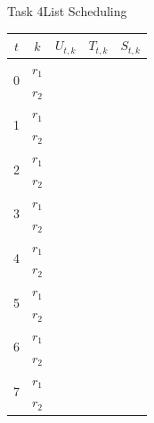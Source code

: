 \begin{frame}{Task 4}{List Scheduling}
  \begin{solutionnoinc}
    \centering
    \tiny
    \begin{tabular}{c|c|l|l|l|}
    \hline$t$ & $k$ & $U_{t, k}$ & $T_{t, k}$ & $S_{t, k}$ \\
    \hline \multirow{2}{*}{0} & $r_1$ & & & \\
    \cline { 2 - 5 } & $r_2$ & & & \\
    \hline \multirow{2}{*}{1} & $r_1$ & & & \\
    \cline { 2 - 5 } & $r_2$ & & & \\
    \hline \multirow{2}{*}{2} & $r_1$ & & & \\
    \cline { 2 - 5 } & $r_2$ & & & \\
    \hline \multirow{2}{*}{3} & $r_1$ & & & \\
    \cline { 2 - 5 } & $r_2$ & & & \\
    \hline \multirow{2}{*}{4} & $r_1$ & & & \\
    \cline { 2 - 5 } & $r_2$ & & & \\
    \hline \multirow{2}{*}{5} & $r_1$ & & & \\
    \cline { 2 - 5 } & $r_2$ & & & \\
    \hline \multirow{2}{*}{6} & $r_1$ & & & \\
    \cline { 2 - 5 } & $r_2$ & & & \\
    \hline \multirow{2}{*}{7} & $r_1$ & & & \\
    \cline { 2 - 5 } & $r_2$ & & & \\
    \hline
    \end{tabular}
  \end{solutionnoinc}
\end{frame}

